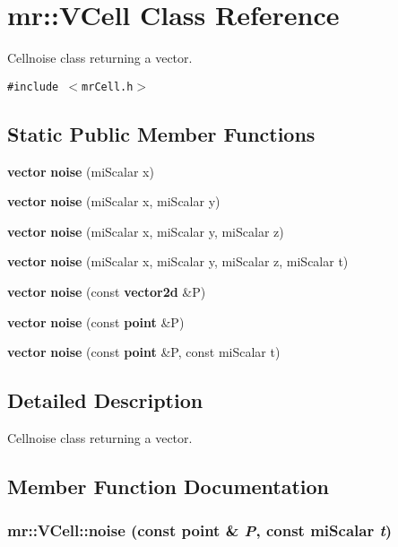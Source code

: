 \section{mr::VCell Class Reference}
\label{classmr_1_1VCell}
Cellnoise class returning a vector.  


{\tt \#include $<$mr\-Cell.h$>$}

\subsection*{Static Public Member Functions}
\begin{CompactItemize}
\item 
{\bf vector} {\bf noise} (mi\-Scalar x)
\item 
{\bf vector} {\bf noise} (mi\-Scalar x, mi\-Scalar y)
\item 
{\bf vector} {\bf noise} (mi\-Scalar x, mi\-Scalar y, mi\-Scalar z)
\item 
{\bf vector} {\bf noise} (mi\-Scalar x, mi\-Scalar y, mi\-Scalar z, mi\-Scalar t)
\item 
{\bf vector} {\bf noise} (const {\bf vector2d} \&P)
\item 
{\bf vector} {\bf noise} (const {\bf point} \&P)
\item 
{\bf vector} {\bf noise} (const {\bf point} \&P, const mi\-Scalar t)
\end{CompactItemize}


\subsection{Detailed Description}
Cellnoise class returning a vector. 



\subsection{Member Function Documentation}
\subsubsection{ mr::VCell::noise (const {\bf point} \& {\em P}, const mi\-Scalar {\em t})\hspace{0.3cm}{\tt  [inline, static]}}\label{classmr_1_1VCell_e6}


